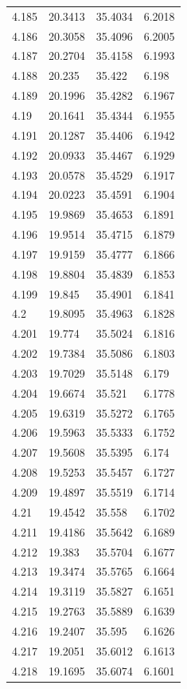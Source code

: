 \begin{tabular}{llll}
4.185 & 20.3413 & 35.4034 & 6.2018 \\
4.186 & 20.3058 & 35.4096 & 6.2005 \\
4.187 & 20.2704 & 35.4158 & 6.1993 \\
4.188 & 20.235 & 35.422 & 6.198 \\
4.189 & 20.1996 & 35.4282 & 6.1967 \\
4.19 & 20.1641 & 35.4344 & 6.1955 \\
4.191 & 20.1287 & 35.4406 & 6.1942 \\
4.192 & 20.0933 & 35.4467 & 6.1929 \\
4.193 & 20.0578 & 35.4529 & 6.1917 \\
4.194 & 20.0223 & 35.4591 & 6.1904 \\
4.195 & 19.9869 & 35.4653 & 6.1891 \\
4.196 & 19.9514 & 35.4715 & 6.1879 \\
4.197 & 19.9159 & 35.4777 & 6.1866 \\
4.198 & 19.8804 & 35.4839 & 6.1853 \\
4.199 & 19.845 & 35.4901 & 6.1841 \\
4.2 & 19.8095 & 35.4963 & 6.1828 \\
4.201 & 19.774 & 35.5024 & 6.1816 \\
4.202 & 19.7384 & 35.5086 & 6.1803 \\
4.203 & 19.7029 & 35.5148 & 6.179 \\
4.204 & 19.6674 & 35.521 & 6.1778 \\
4.205 & 19.6319 & 35.5272 & 6.1765 \\
4.206 & 19.5963 & 35.5333 & 6.1752 \\
4.207 & 19.5608 & 35.5395 & 6.174 \\
4.208 & 19.5253 & 35.5457 & 6.1727 \\
4.209 & 19.4897 & 35.5519 & 6.1714 \\
4.21 & 19.4542 & 35.558 & 6.1702 \\
4.211 & 19.4186 & 35.5642 & 6.1689 \\
4.212 & 19.383 & 35.5704 & 6.1677 \\
4.213 & 19.3474 & 35.5765 & 6.1664 \\
4.214 & 19.3119 & 35.5827 & 6.1651 \\
4.215 & 19.2763 & 35.5889 & 6.1639 \\
4.216 & 19.2407 & 35.595 & 6.1626 \\
4.217 & 19.2051 & 35.6012 & 6.1613 \\
4.218 & 19.1695 & 35.6074 & 6.1601 \\

\end{tabular}

